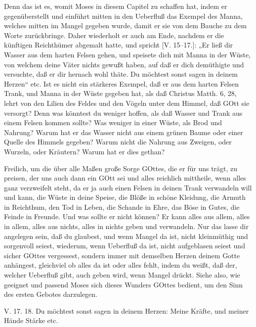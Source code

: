 Denn das ist es, womit Moses in diesem Capitel zu schaffen hat, indem er gegenüberstellt und einführt mitten in den Ueberfluß das Exempel des Manna, welches mitten im Mangel gegeben wurde, damit er sie von dem Bauche zu dem Worte zurückbringe. Daher wiederholt er auch am Ende, nachdem er die künftigen Reichthümer abgemalt hatte, und spricht [V. 15–17.]: „Er ließ dir Wasser aus dem harten Felsen gehen, und speisete dich mit Manna in der Wüste, von welchem deine Väter nichts gewußt haben, auf daß er dich demüthigte und versuchte, daß er dir hernach wohl thäte. Du möchtest sonst sagen in deinem Herzen“ etc. Ist es nicht ein stärkeres Exempel, daß er aus dem harten Felsen Trank, und Manna in der Wüste gegeben hat, als daß Christus Matth. 6, 28, lehrt von den Lilien des Feldes und den Vögeln unter dem Himmel, daß GOtt sie versorgt? Denn was könntest du weniger hoffen, als daß Wasser und Trank aus einem Felsen kommen sollte? Was weniger in einer Wüste, als Brod und Nahrung? Warum hat er das Wasser nicht aus einem grünen Baume oder einer Quelle des Himmels gegeben? Warum nicht die Nahrung aus Zweigen, oder Wurzeln, oder Kräutern? Warum hat er dies gethan?

Freilich, um die über alle Maßen große Sorge GOttes, die er für uns trägt, zu preisen, der uns auch dann ein GOtt sei und alles reichlich mittheile, wenn alles ganz verzweifelt steht, da er ja auch einen Felsen in deinen Trank verwandeln will und kann, die Wüste in deine Speise, die Blöße in schöne Kleidung, die Armuth in Reichthum, den Tod in Leben, die Schande in Ehre, das Böse in Gutes, die Feinde in Freunde. Und was sollte er nicht können? Er kann alles aus allem, alles in allem, alles aus nichts, alles in nichts geben und verwandeln. Nur das lasse dir angelegen sein, daß du glaubest, und wenn Mangel da ist, nicht kleinmüthig und sorgenvoll seiest, wiederum, wenn Ueberfluß da ist, nicht aufgeblasen seiest und sicher GOttes vergessest, sondern immer mit demselben Herzen deinem Gotte anhängest, gleichviel ob alles da ist oder alles fehlt, indem du weißt, daß der, welcher Ueberfluß gibt, auch geben wird, wenn Mangel drückt. Siehe also, wie geeignet und passend Moses sich dieses Wunders GOttes bedient, um den Sinn des ersten Gebotes darzulegen.

\begin{schriftzitat}
V. 17. 18. Du möchtest sonst sagen in deinem Herzen: Meine Kräfte, und meiner Hände Stärke etc.
\end{schriftzitat}

